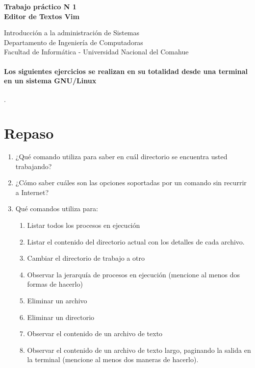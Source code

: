 \documentclass[12pt]{article}
\def\maketitle{

 \makeatletter
 {\color{bl} \centering \huge \sc \textbf{
Trabajo práctico N 1 \\
\large \vspace*{-8pt} \color{black} Editor de Textos Vim
 \vspace*{8pt} }\par}
 \makeatother


 \makeatletter
 {\centering \small 
	Introducción a la administración de Sistemas \\
 	Departamento de Ingeniería de Computadoras \\
 	Facultad de Informática - Universidad Nacional del Comahue \\
 	\vspace{20pt} }
 \makeatother

}
\begin{document}
\thispagestyle{empty}
\maketitle
\setlength{\parindent}{0pt}

\paragraph{Los siguientes ejercicios se realizan en su totalidad desde una terminal
en un sistema GNU/Linux}. 

\section*{Repaso}
\begin{enumerate}
\item ¿Qué comando utiliza para saber en cuál directorio se encuentra usted trabajando?
\item ¿Cómo saber cuáles son las opciones soportadas por un comando sin recurrir a Internet?
\item Qué comandos utiliza para: 
	\begin{enumerate}
	\item Listar todos los procesos en ejecución
	\item Listar el contenido del directorio actual con los detalles de cada archivo. 
	\item Cambiar el directorio de trabajo a otro
	\item Observar la jerarquía de procesos en ejecución (mencione al menos dos formas de hacerlo)
	\item Eliminar un archivo
	\item Eliminar un directorio 
	\item Observar el contenido de un archivo de texto
	\item Observar el contenido de un archivo de texto largo, paginando la salida en 
	la terminal (mencione al menos dos maneras de hacerlo). 
	\end{enumerate}
\end{enumerate}
\end{document}

